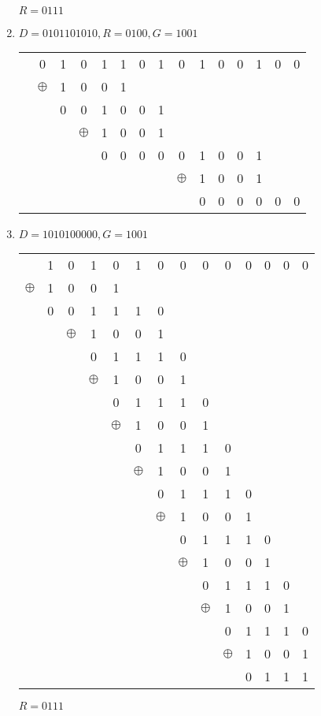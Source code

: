 \documentclass[12pt, a4paper]{article}
\begin{document}
\begin{enumerate}[a]
	$R = 0111$
	\item %
	$D = 0101101010, R = 0100, G = 1001$

	\begin{tabular}{ccccccccccccccc}
		& 0 & 1 & 0 & 1 & 1 & 0 & 1 & 0 & 1 & 0 & 0 & 1 & 0 & 0\\
		& $\oplus$ & 1 & 0 & 0 & 1\\\cline{3-6}
		&& 0 & 0 & 1 & 0 & 0 & 1\\
		&&& $\oplus$ & 1 & 0 & 0 & 1\\\cline{5-8}
		&&&& 0 & 0 & 0 & 0 & 0 & 1 & 0 & 0 & 1\\
		&&&&&&&& $\oplus$ & 1 & 0 & 0 & 1\\\cline{10-13}
		&&&&&&&&& 0 & 0 & 0 & 0 & 0 & 0\\
	\end{tabular}

	\item %
	$D = 1010100000, G = 1001$

	\begin{tabular}{cccccccccccccc}
		& 1 & 0 & 1 & 0 & 1 & 0 & 0 & 0 & 0 & 0 & 0 & 0 & 0\\
		$\oplus$ & 1 & 0 & 0 & 1\\\cline{2-5}
		& 0 & 0 & 1 & 1 & 1 & 0\\
		&& $\oplus$ & 1 & 0 & 0 & 1\\\cline{4-7}
		&&& 0 & 1 & 1 & 1 & 0\\
		&&& $\oplus$ & 1 & 0 & 0 & 1\\\cline{5-8}
		&&&& 0 & 1 & 1 & 1 & 0\\
		&&&& $\oplus$ & 1 & 0 & 0 & 1\\\cline{6-9}
		&&&&& 0 & 1 & 1 & 1 & 0\\
		&&&&& $\oplus$ & 1 & 0 & 0 & 1\\\cline{7-10}
		&&&&&& 0 & 1 & 1 & 1 & 0\\
		&&&&&& $\oplus$ & 1 & 0 & 0 & 1\\\cline{8-11}
		&&&&&&& 0 & 1 & 1 & 1 & 0\\
		&&&&&&& $\oplus$ & 1 & 0 & 0 & 1\\\cline{9-12}
		&&&&&&&& 0 & 1 & 1 & 1 & 0\\
		&&&&&&&& $\oplus$ & 1 & 0 & 0 & 1\\\cline{10-13}
		&&&&&&&&& 0 & 1 & 1 & 1 & 0\\
		&&&&&&&&& $\oplus$ & 1 & 0 & 0 & 1\\\cline{11-14}
		&&&&&&&&&& 0 & 1 & 1 & 1\\
	\end{tabular}

	$R = 0111$
\end{enumerate}
\end{document}
